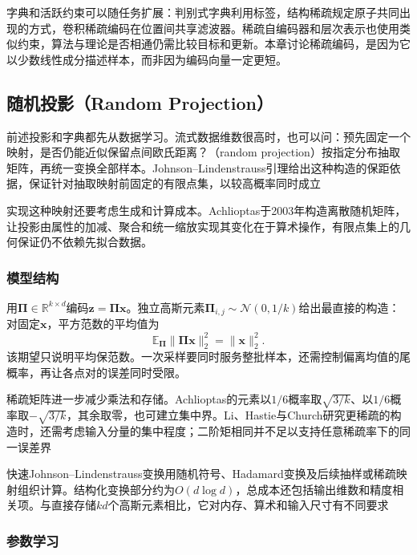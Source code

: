 字典和活跃约束可以随任务扩展：判别式字典利用标签，结构稀疏规定原子共同出现的方式，卷积稀疏编码在位置间共享滤波器。稀疏自编码器和层次表示也使用类似约束，算法与理论是否相通仍需比较目标和更新。本章讨论稀疏编码，是因为它以少数线性成分描述样本，而非因为编码向量一定更短。

\subsection{随机投影（Random Projection）}
\label{sec:dim-rp}

前述投影和字典都先从数据学习。流式数据维数很高时，也可以问：预先固定一个映射，是否仍能近似保留点间欧氏距离？（random projection）按指定分布抽取矩阵，再统一变换全部样本。Johnson--Lindenstrauss引理给出这种构造的保距依据，保证针对抽取映射前固定的有限点集，以较高概率同时成立

实现这种映射还要考虑生成和计算成本。Achlioptas于2003年构造离散随机矩阵，让投影由属性的加减、聚合和统一缩放实现其变化在于算术操作，有限点集上的几何保证仍不依赖先拟合数据。

\subsubsection{模型结构}
\label{sec:dim-rp-structure}

用$\bm{\Pi}\in\mathbb{R}^{k\times d}$编码$\bm{z}=\bm{\Pi}\bm{x}$。独立高斯元素$\bm{\Pi}_{i,j}\sim\mathcal{N}(0,1/k)$给出最直接的构造：对固定$\bm{x}$，平方范数的平均值为
\[
  \mathbb{E}_{\bm{\Pi}}\lVert\bm{\Pi}\bm{x}\rVert_2^2
  =\lVert\bm{x}\rVert_2^2.
\]
该期望只说明平均保范数。一次采样要同时服务整批样本，还需控制偏离均值的尾概率，再让各点对的误差同时受限。

稀疏矩阵进一步减少乘法和存储。Achlioptas的元素以$1/6$概率取$\sqrt{3/k}$、以$1/6$概率取$-\sqrt{3/k}$，其余取零，也可建立集中界。Li、Hastie与Church研究更稀疏的构造时，还需考虑输入分量的集中程度；二阶矩相同并不足以支持任意稀疏率下的同一误差界

快速Johnson--Lindenstrauss变换用随机符号、Hadamard变换及后续抽样或稀疏映射组织计算。结构化变换部分约为$O(d\log d)$，总成本还包括输出维数和精度相关项。与直接存储$kd$个高斯元素相比，它对内存、算术和输入尺寸有不同要求

\subsubsection{参数学习}
\label{sec:dim-rp-learning}

